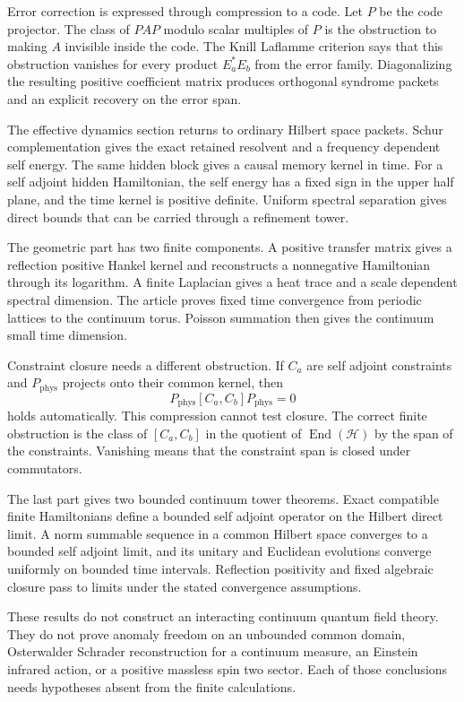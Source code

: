 \documentclass{aomart}
\theoremstyle{definition}
\theoremstyle{remark}
\newcommand{\Hcal}{\mathcal H}
\newcommand{\End}{\operatorname{End}}
\newcommand{\phys}{\mathrm{phys}}
\begin{document}
Error correction is expressed through compression to a code. Let \(P\) be the code projector. The class of \(PAP\) modulo scalar multiples of \(P\) is the obstruction to making \(A\) invisible inside the code. The Knill Laflamme criterion says that this obstruction vanishes for every product \(E_a^*E_b\) from the error family. Diagonalizing the resulting positive coefficient matrix produces orthogonal syndrome packets and an explicit recovery on the error span.

The effective dynamics section returns to ordinary Hilbert space packets. Schur complementation gives the exact retained resolvent and a frequency dependent self energy. The same hidden block gives a causal memory kernel in time. For a self adjoint hidden Hamiltonian, the self energy has a fixed sign in the upper half plane, and the time kernel is positive definite. Uniform spectral separation gives direct bounds that can be carried through a refinement tower.

The geometric part has two finite components. A positive transfer matrix gives a reflection positive Hankel kernel and reconstructs a nonnegative Hamiltonian through its logarithm. A finite Laplacian gives a heat trace and a scale dependent spectral dimension. The article proves fixed time convergence from periodic lattices to the continuum torus. Poisson summation then gives the continuum small time dimension.

Constraint closure needs a different obstruction. If \(C_a\) are self adjoint constraints and \(P_{\phys}\) projects onto their common kernel, then
\[
P_{\phys}[C_a,C_b]P_{\phys}=0
\]
holds automatically. This compression cannot test closure. The correct finite obstruction is the class of \([C_a,C_b]\) in the quotient of \(\End(\Hcal)\) by the span of the constraints. Vanishing means that the constraint span is closed under commutators.

The last part gives two bounded continuum tower theorems. Exact compatible finite Hamiltonians define a bounded self adjoint operator on the Hilbert direct limit. A norm summable sequence in a common Hilbert space converges to a bounded self adjoint limit, and its unitary and Euclidean evolutions converge uniformly on bounded time intervals. Reflection positivity and fixed algebraic closure pass to limits under the stated convergence assumptions.

These results do not construct an interacting continuum quantum field theory. They do not prove anomaly freedom on an unbounded common domain, Osterwalder Schrader reconstruction for a continuum measure, an Einstein infrared action, or a positive massless spin two sector. Each of those conclusions needs hypotheses absent from the finite calculations.
\end{document}
